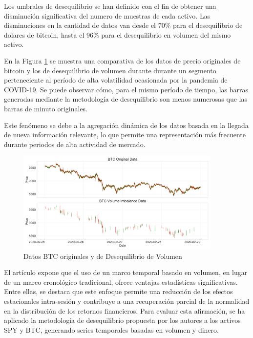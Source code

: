\documentclass[a4paper,12pt, twoside]{report}
\begin{document}
Los umbrales de desequilibrio se han definido con el fin de obtener una disminución significativa del numero de muestras de cada activo. Las 
disminuciones en la cantidad de datos van desde el 70\% para el desequilibrio de dolares de bitcoin, hasta el 96\% para el desequilibrio en volumen del
mismo activo.

En la Figura \ref{fig:btc-vol-imb-comp} se muestra una comparativa de los datos de precio originales de bitcoin y 
los de desequilibrio de volumen durante durante un segmento perteneciente al período de alta volatilidad ocasionada 
por la pandemia de COVID-19. Se puede observar cómo, para el mismo período de tiempo, las barras generadas mediante la metodología de desequilibrio 
son menos numerosas que las barras de minuto originales. 

Este fenómeno se debe a la agregación dinámica de los datos basada en la llegada de nueva información relevante, lo que permite una representación más frecuente
durante periodos de alta actividad de mercado.

\begin{figure}[H]
    \centering
    \includegraphics[width=0.9\textwidth]{./figures/btc_original_volume_imabalance_comp.png}
    \caption{Datos BTC originales y de Desequilibrio de Volumen}
    \label{fig:btc-vol-imb-comp}
\end{figure}

El artículo \cite{easley2012volume} expone que el uso de un marco temporal basado en volumen, en lugar de un 
marco cronológico tradicional, ofrece ventajas estadísticas significativas. Entre ellas, se destaca que 
este enfoque permite una reducción de los efectos estacionales intra-sesión y contribuye a una recuperación 
parcial de la normalidad en la distribución de los retornos financieros. Para evaluar esta afirmación, se 
ha aplicado la metodología de desequilibrio propuesta por los autores a los activos SPY y BTC, generando 
series temporales basadas en volumen y dinero.
\end{document}
